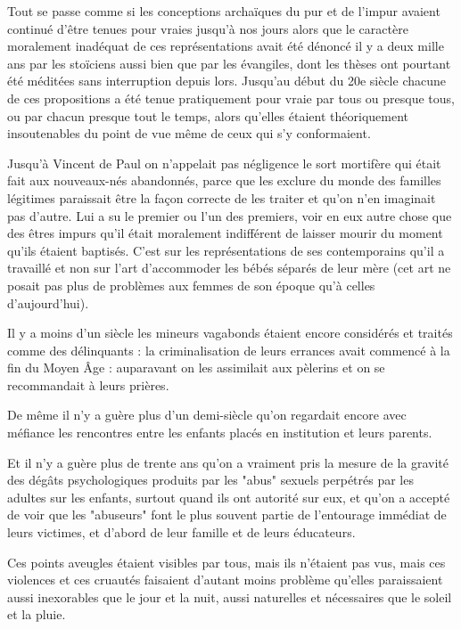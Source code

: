  Tout se passe comme si les conceptions archaïques du pur et de l'impur avaient continué d'être tenues pour vraies jusqu'à nos jours alors que le caractère moralement inadéquat de ces représentations avait été dénoncé il y a deux mille ans par les stoïciens aussi bien que par les évangiles, dont les thèses ont pourtant été méditées sans interruption depuis lors. Jusqu'au début du 20e siècle chacune de ces propositions a été tenue pratiquement pour vraie par tous ou presque tous, ou par chacun presque tout le temps, alors qu'elles étaient théoriquement insoutenables du point de vue même de ceux qui s'y conformaient. 
 
 Jusqu'à Vincent de Paul on n'appelait pas négligence le sort mortifère qui était fait aux nouveaux-nés abandonnés, parce que les exclure du monde des familles légitimes paraissait être la façon correcte de les traiter et qu'on n'en imaginait pas d'autre. Lui a su le premier ou l'un des premiers, voir en eux autre chose que des êtres impurs qu'il était moralement indifférent de laisser mourir du moment qu'ils étaient baptisés. C'est sur les représentations de ses contemporains qu'il a travaillé et non sur l'art d'accommoder les bébés séparés de leur mère (cet art ne posait pas plus de problèmes aux femmes de son époque qu'à celles d'aujourd'hui). 
 
 Il y a moins d'un siècle les mineurs vagabonds étaient encore considérés et traités comme des délinquants : la criminalisation de leurs errances avait commencé à la fin du Moyen Âge : auparavant on les assimilait aux pèlerins et on se recommandait à leurs prières. 
 
 De même il n'y a guère plus d'un demi-siècle qu'on regardait encore avec méfiance les rencontres entre les enfants placés en institution et leurs parents. 
 
 Et il n'y a guère plus de trente ans qu'on a vraiment pris la mesure de la gravité des dégâts psychologiques produits par les "abus" sexuels perpétrés par les adultes sur les enfants, surtout quand ils ont autorité sur eux, et qu'on a accepté de voir que les "abuseurs" font le plus souvent partie de l'entourage immédiat de leurs victimes, et d’abord de leur famille et de leurs éducateurs. 
 
 Ces points aveugles étaient visibles par tous, mais ils n'étaient pas vus, mais ces violences et ces cruautés faisaient d'autant moins problème qu'elles paraissaient aussi inexorables que le jour et la nuit, aussi naturelles et nécessaires que le soleil et la pluie. 
 
